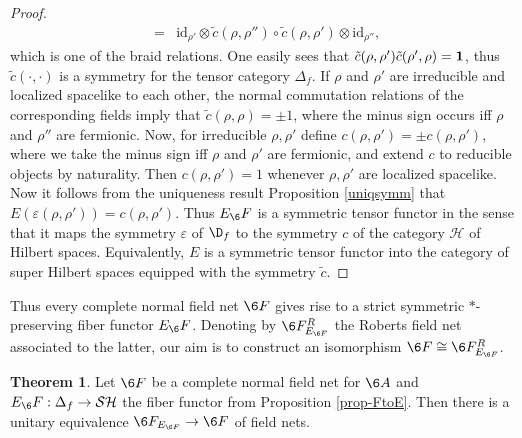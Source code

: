 \documentclass[12pt]{article}
\theoremstyle{definition}
\newtheorem{thm}{Theorem}[section]
\theoremstyle{definition}
\theoremstyle{remark}
\newcommand{\ve}{\varepsilon}
\def\2#1{{\mathcal #1}}
\def\1#1{{\bf #1}}
\newcommand{\rarr}{\rightarrow}
\def\id{\mathrm{id}}
\begin{document}
\begin{proof}
\begin{eqnarray*}
   &=& \id_{\rho'}\otimes\tilde{c}(\rho,\rho'')\circ\tilde{c}(\rho,\rho')\otimes\id_{\rho''},
\end{eqnarray*}
which is one of the braid relations. One easily sees that
$\tilde{c}(\rho,\rho')\tilde{c}(\rho',\rho)=\11$, thus $\tilde{c}(\cdot,\cdot)$ is a symmetry for
the tensor category $\Delta_f$. If $\rho$ and $\rho'$ are irreducible and localized spacelike to
each other, the normal commutation relations of the corresponding fields imply that
$\tilde{c}(\rho,\rho)=\pm 1$, where the minus sign occurs iff $\rho$ and $\rho''$ are
fermionic. Now, for irreducible $\rho,\rho'$ define $c(\rho,\rho')=\pm c(\rho,\rho')$, where we take
the minus sign iff $\rho$ and $\rho'$ are fermionic, and extend $c$ to reducible objects by
naturality. Then $c(\rho,\rho')=1$ whenever $\rho,\rho'$ are localized spacelike. Now it follows
from the uniqueness result Proposition \ref{uniqsymm} that $E(\ve(\rho,\rho'))=c(\rho,\rho')$. 
Thus $E_\6F$ is a symmetric tensor functor in the sense that it maps the symmetry $\ve$ of $\D_f$ to
the symmetry $c$ of the category $\2H$ of Hilbert spaces. Equivalently, $E$ is a symmetric tensor
functor into the category of super Hilbert spaces equipped with the symmetry $\widetilde{c}$.
\end{proof}

Thus every complete normal field net $\6F$ gives rise to a strict symmetric $*$-preserving fiber
functor $E_\6F$. Denoting by $\6F^R_{E_{\6F}}$ the Roberts field net associated to the latter, our
aim is to construct an isomorphism $\6F\cong\6F^R_{E_{\6F}}$. 

\begin{thm} Let $\6F$ be a complete normal field net for $\6A$ and $E_\6F:\Delta_f\rarr\2S\2H$ the fiber
functor from Proposition \ref{prop-FtoE}. Then there is a unitary equivalence
$\6F_{E_{\6F}}\rarr\6F$ of field nets.
\end{thm}
\end{document}
